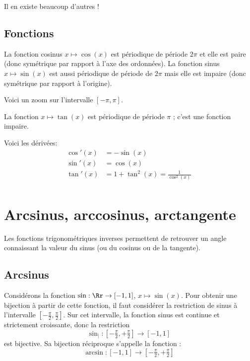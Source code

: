 \documentclass[11pt,class=report,crop=false]{standalone}
\begin{document}
Il en existe beaucoup d'autres !

\subsection{Fonctions}

La fonction cosinus $x \mapsto \cos(x)$ est périodique de période $2\pi$
et elle est paire (donc symétrique par rapport à l'axe des ordonnées).
La fonction sinus $x \mapsto \sin(x)$ est aussi périodique de période de $2\pi$ mais elle est impaire (donc symétrique par rapport à l'origine).



Voici un zoom sur l'intervalle $[-\pi,\pi]$.



La fonction $x \mapsto \tan(x)$ est périodique de période $\pi$ ; c'est une fonction impaire.



Voici les dérivées:
\begin{align*}
	\cos'(x)&= -\sin(x)\\
	\sin'(x)&=\cos(x)\\
	\tan'(x) &= 1+\tan^2(x)=\frac{1}{\cos^2(x)}\\
\end{align*}


\section{Arcsinus, arccosinus, arctangente}


Les fonctions trigonométriques inverses permettent de retrouver un angle connaissant la valeur du sinus (ou du cosinus ou de la tangente).

\subsection{Arcsinus}

Considérons la fonction $\sin : \Rr \to [-1,1]$, $x \mapsto \sin(x)$.
Pour obtenir une bijection à partir de cette fonction, il faut considérer la restriction
de sinus à l'intervalle $[-\frac\pi2,\frac\pi2]$. Sur cet intervalle, la fonction sinus est continue et strictement croissante, donc la restriction
$$\sin_| : [-\tfrac\pi2,+\tfrac\pi2] \to [-1,1]$$
est bijective.
Sa bijection réciproque s'appelle la fonction  :
$$\arcsin : [-1,1] \to [-\tfrac\pi2,+\tfrac\pi2]$$
\end{document}
